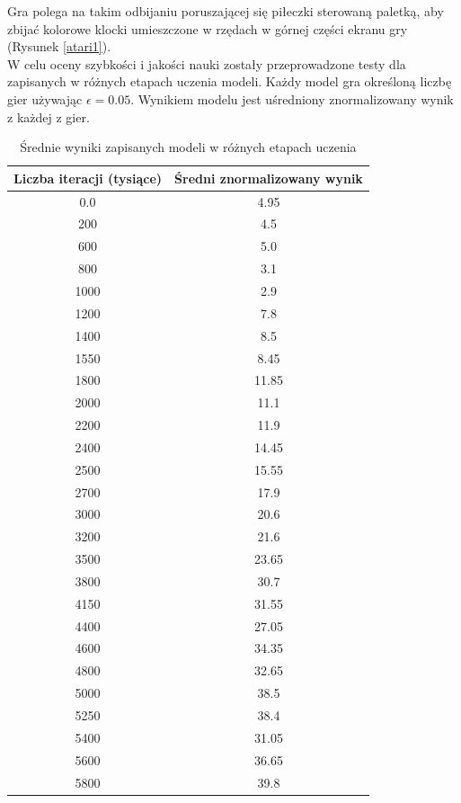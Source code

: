\documentclass[12pt]{article}
\begin{document}
Gra polega na takim odbijaniu poruszającej się piłeczki sterowaną paletką, aby zbijać kolorowe klocki umieszczone w rzędach w górnej części ekranu gry (Rysunek \ref{atari1}).
\\
W celu oceny szybkości i jakości nauki zostały przeprowadzone testy dla zapisanych w różnych etapach uczenia modeli. Każdy model gra określoną liczbę gier używając $\epsilon=0.05$. Wynikiem modelu jest uśredniony znormalizowany wynik z każdej z gier. 

\begin{center}
\begin{table}[H]
  \centering%
  \caption{Średnie wyniki zapisanych modeli w różnych etapach uczenia}
\begin{tabular}{|c|c|}
\hline
\textbf{Liczba iteracji (tysiące)} & \textbf{Średni znormalizowany wynik}\\
\hline
0.0  &  4.95 \\
\hline
200  &  4.5 \\
\hline
600  &  5.0 \\
\hline
800  &  3.1 \\
\hline
1000  &  2.9 \\
\hline
1200  &  7.8 \\
\hline
1400  &  8.5 \\
\hline
1550  &  8.45 \\
\hline
1800  &  11.85 \\
\hline
2000  &  11.1 \\
\hline
2200  &  11.9 \\
\hline
2400  &  14.45 \\
\hline
2500  &  15.55 \\
\hline
2700  &  17.9 \\
\hline
3000  &  20.6 \\
\hline
3200  &  21.6 \\
\hline
3500  &  23.65 \\
\hline
3800  &  30.7 \\
\hline
4150  &  31.55 \\
\hline
4400  &  27.05 \\
\hline
4600  &  34.35 \\
\hline
4800  &  32.65 \\
\hline
5000  &  38.5 \\
\hline
5250  &  38.4 \\
\hline
5400  &  31.05 \\
\hline
5600  &  36.65 \\
\hline
5800  &  39.8 \\

\end{tabular}
\end{table}
\end{center}
\end{document}
